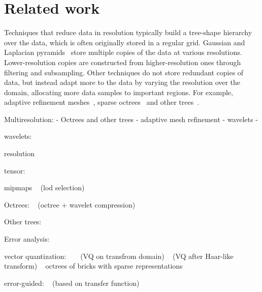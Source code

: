 \section{Related work}

Techniques that reduce data in resolution typically build a tree-shape hierarchy over the data,
which is often originally stored in a regular grid. Gaussian and Laplacian
pyramids~\cite{laplacian-pyramid} store multiple copies of the data at various resolutions.
Lower-resolution copies are constructed from higher-resolution ones through filtering and
subsampling. Other techniques do not store redundant copies of data, but instead adapt more to the
data by varying the resolution over the domain, allocating more data samples to important regions.
For example, adaptive refinement meshes~\cite{amr1989}, sparse octrees~\cite{gigavoxels} and other
trees~\cite{vdb2013}.

Multiresolution:
- Octrees and other trees
- adaptive mesh refinement
- wavelets
-

wavelets:
~\cite{treib}
~\cite{multires-framework}
~\cite{compression-domain-volume-rendering}
~\cite{interactive-rendering-large-volume}
~\cite{rapid-compression-volume}
~\cite{survey-multires}
~\cite{multires_toolkit2003}
~\cite{wavelet-compression-interactive-vis}

resolution
~\cite{multires-volume-rendering}
~\cite{in-situ-sampling-particle}

tensor:
~\cite{tensor_dvr2015}
~\cite{multiscale-tensor}
~\cite{tamresh}

mipmaps
~\cite{multires_octree1999} (lod selection)
~\cite{interactive-exploration-ct-scans}

Octrees:
~\cite{sph-octree} (octree + wavelet compression)

Other trees:
~\cite{vdb2013}
~\cite{fogal-kdtree}

Error analysis:
~\cite{evaluating-compression-climate}
~\cite{compression_sim2013}
~\cite{statistical-volume-quality}
~\cite{evaluating-efficacy-wavelet}
~\cite{topology-verification-isosurface}
~\cite{verifiable-isosurface}
~\cite{verifying-volume-rendering}
~\cite{statistical-volume-quality}

vector quantization:
~\cite{vq1992}
~\cite{hw_dvr2007} (VQ on transfrom domain)
~\cite{compression_domain2003} (VQ after Haar-like transform)
~\cite{covra2012} octrees of bricks with sparse representations

error-guided: 
~\cite{tf_decompression2004} (based on transfer function)

